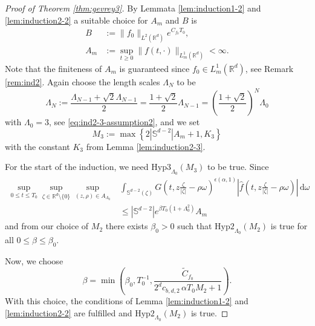 \documentclass[11pt,a4paper,reqno]{amsart}
\theoremstyle{plain}
\theoremstyle{definition}
\begin{document}
\begin{proof}[Proof of Theorem \ref{thm:gevrey3}]
By Lemmata \ref{lem:induction1-2} and \ref{lem:induction2-2} a suitable choice for $A_m$ and  $B$ is
 \begin{align*}
    B&:= \|f_0\|_{L^2({\mathbb{R}}^d)} e^{C_{f_0}T_0}, \\
    A_m&:= \sup_{t\geq 0} \|f(t, \cdot)\|_{L^1_m({\mathbb{R}}^d)} < \infty.
   \end{align*}
   Note that the finiteness of $A_m$ is guaranteed since $f_0 \in L^1_m({\mathbb{R}}^d)$, see Remark \ref{rem:ind2}. Again choose the length scales $\Lambda_N$ to be
  \begin{equation*}
    \Lambda_N := \frac{\Lambda_{N-1}+\sqrt{2}\Lambda_{N-1}}{2} = \frac{1+\sqrt{2}}{2}\Lambda_{N-1} =
    \left( \frac{1+\sqrt{2}}{2} \right)^N \Lambda_0
  \end{equation*}
  with  $\Lambda_0=3$, see \eqref{eq:ind2-3-assumption2}, and we set
  \begin{equation*}
    M_3:= \max \left\{ 2 |{\mathbb{S}}^{d-2}|A_m+1, K_3 \right\}
  \end{equation*}	
  with the constant $K_3$ from Lemma \ref{lem:induction2-3}.

 For the start of the induction, we need $\mathrm{Hyp3}_{\Lambda_0}(M_3)$ to be true.
 Since
 \begin{align*}
 	\sup_{0\le t\le T_0}
 	\sup_{\zeta\in{\mathbb{R}}^d\setminus\{0\}} \sup_{(z,\rho)\in A_{\Lambda_0}}  &\int_{{\mathbb{S}}^{d-2}(\zeta)} G\left(t,z\tfrac{\zeta}{|\zeta|} - \rho \omega \right)^{\epsilon(\alpha, 1)} \left|\hat{f}\left(t,z\tfrac{\zeta}{|\zeta|} - \rho \omega \right)\right|\,\mathrm{d}\omega \\
 	&\le |{\mathbb{S}}^{d-2}|e^{\beta T_0 (1+\Lambda_0^2)} A_m
  \end{align*}
  and from our choice of $M_2$ there exists $\beta_0 >0$ such that $\mathrm{Hyp2}_{\Lambda_0}(M_2)$ is true for all $0\le\beta\le \beta_0$.

  Now, we choose
  \begin{equation*}
  	\beta=\min \left( \beta_0, T_0^{-1},\frac{\tilde{C}_{f_0}}{2^d c_{b,d,2} \, \alpha T_0 M_2 +1} \right).
  \end{equation*}
  With this choice, the conditions of Lemma \ref{lem:induction1-2} and \ref{lem:induction2-2} are fulfilled and $\mathrm{Hyp2}_{\Lambda_0}(M_2)$ is true.


\end{proof}
\end{document}
